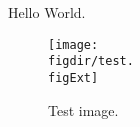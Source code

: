 \documentclass[a4paper]{article}
\newcommand{\figdir}{figs}
\newcommand{\figExt}{png}
\begin{document}
Hello World.

\begin{figure}[!ht]
  \texttt{[image: \\figdir/test.\\figExt]}
  \caption{Test image.}
  \label{fig:test}
\end{figure}
\end{document}
